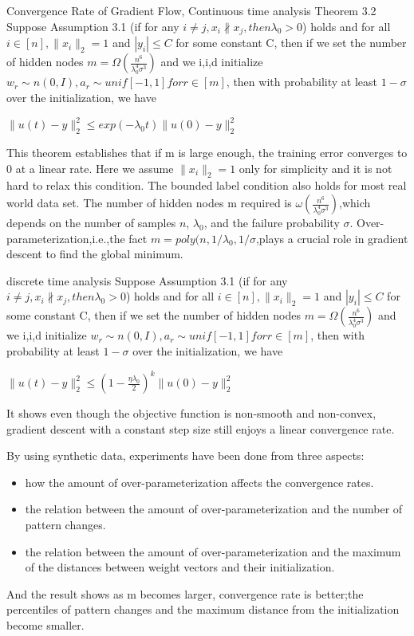 \documentclass{article}
\begin{document}
Convergence Rate of Gradient Flow,
Continuous time analysis
Theorem 3.2 Suppose Assumption 3.1 (if for any $i \neq j,x_i \nparallel x_j, then \lambda_0 >0$) holds and for all $i \in [n],\|x_i\|_{2} = 1$ and $|y_i|\leq C$ for some constant C, then if we set the number of hidden nodes $m=\Omega (\frac{n^6}{\lambda^4_0 \sigma ^3})$ and we i,i,d initialize $w_r\sim n(0,I),a_r \sim unif[{-1,1}] for r\in [m]$, then with probability at least $1-\sigma$ over the initialization, we have 
\begin{center}
    $\|u(t)-y\|^2_2 \leq exp(-\lambda_0 t)\|u(0)-y\|^2_2$
\end{center}

This theorem establishes that if m is large enough, the training error converges to 0 at a linear rate. Here we assume $\|x_i\|_2 = 1$ only for simplicity and it is not hard to relax this condition. The bounded label condition also holds for most real world data set. The number of hidden nodes m required is $\omega(\frac{n^6}{\lambda^4_0 \sigma ^3})$,which depends on the number of samples $n$, $\lambda_0$, and the failure probability $\sigma$. Over-parameterization,i.e.,the fact $m = poly(n,1/{\lambda_0},1/{\sigma}$,plays a crucial role in gradient descent to find the global minimum. 

discrete time analysis
Suppose Assumption 3.1 (if for any $i \neq j,x_i \nparallel x_j, then \lambda_0 >0$) holds and for all $i \in [n],\|x_i\|_{2} = 1$ and $|y_i|\leq C$ for some constant C, then if we set the number of hidden nodes $m=\Omega (\frac{n^6}{\lambda^4_0 \sigma ^3})$ and we i,i,d initialize $w_r\sim n(0,I),a_r \sim unif[{-1,1}] for r\in [m]$, then with probability at least $1-\sigma$ over the initialization, we have 
\begin{center}
    $\|u(t)-y\|^2_2 \leq (1-\frac{\eta \lambda_0}{2})^k\|u(0)-y\|^2_2$
\end{center}
It shows even though the objective function is non-smooth and non-convex, gradient descent with a constant step size still enjoys a linear convergence rate.

By using synthetic data, experiments have been done from three aspects: 
\begin{itemize}
\item how the amount of over-parameterization affects the convergence rates.
\item the relation between the amount of over-parameterization and the number of pattern changes.
\item the relation between the amount of over-parameterization and the maximum of the distances between weight vectors and their initialization. 
\end{itemize}
And the result shows as m becomes larger, convergence rate is better;the percentiles of pattern changes and the maximum distance from the initialization become smaller.
\end{document}
